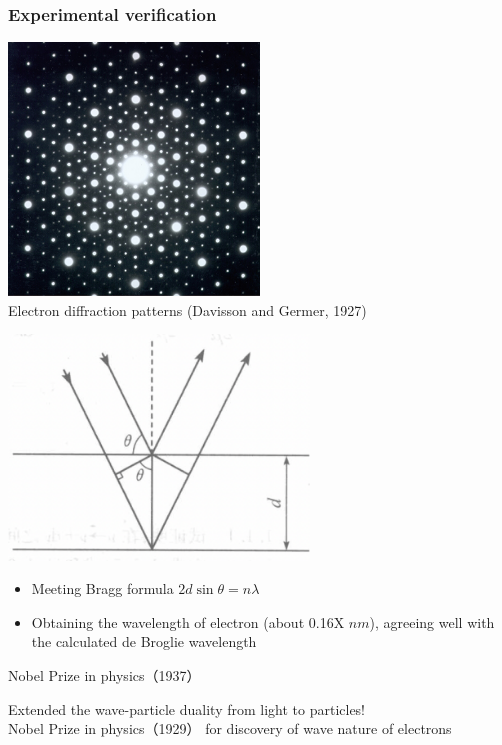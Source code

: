 \begin{frame}   
  \frametitle{Experimental verification}
  \begin{center}
    \includegraphics[width=0.5\textwidth]{figs/elediffr.jpeg} \\
    Electron diffraction patterns (Davisson and Germer, 1927)
\end{center} 
\end{frame}
\begin{frame}   
    \begin{center}
      \includegraphics[width=0.6\textwidth]{figs/scatting.png} \\
    \end{center} 
    \begin{itemize}
        \item Meeting Bragg formula $2d\sin \theta=n\lambda $
        \item Obtaining the wavelength of electron (about 0.16X $nm$), agreeing well with the 
   calculated de Broglie wavelength 
    \end{itemize}
  {\color{deepred} Nobel Prize in physics（1937）}  
  \end{frame}

\begin{frame} 
    \begin{tcolorbox}[colback=yellow!10,colframe=red!75!black,title=]
        Extended the wave-particle duality from light to particles! \\
        {\color{deepred} Nobel Prize in physics（1929）} for discovery of wave nature of electrons
    \end{tcolorbox}  
\end{frame}

